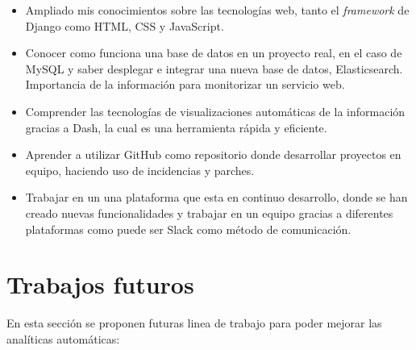 		\begin{itemize}
			\item Ampliado mis conocimientos sobre las tecnologías web, tanto el \textit{framework} de Django como 		HTML, CSS y JavaScript.
			
			\item Conocer como funciona una base de datos en un proyecto real, en el caso de MySQL y saber desplegar e integrar una nueva base de datos, Elasticsearch. Importancia de la información para monitorizar un servicio web. 
			
			\item Comprender las tecnologías de visualizaciones automáticas de la información gracias a Dash, la cual es una herramienta rápida y eficiente.
			
			\item Aprender a utilizar GitHub como repositorio donde desarrollar proyectos en equipo, haciendo uso de incidencias y parches. 
			
			\item Trabajar en un una plataforma que esta en continuo desarrollo, donde se han creado nuevas funcionalidades y trabajar en un equipo gracias a diferentes plataformas como puede ser Slack como método de comunicación.			
		\end{itemize}
	\section{Trabajos futuros} 
	\label{sec:trabajos_futuros} 

		En esta sección se proponen futuras linea de trabajo para poder mejorar las analíticas automáticas:

